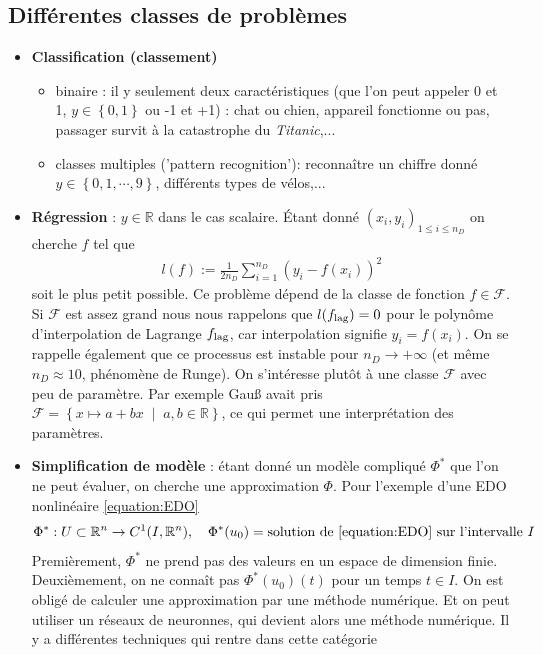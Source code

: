 \documentclass[11pt,a4paper, french]{article}
\newcommand{\ndata}{n_D}
\newcommand{\R}{\mathbb R}
\newcommand{\Set}[1]{\left\{#1\right\}}
\newcommand{\SetDef}[2]{\left\{#1\;\middle|\;#2\right\}}
\begin{document}
\subsection{Différentes classes de problèmes}\label{subsec:}
%
\begin{itemize}
%
\item \textbf{Classification (classement)}
\begin{itemize}
\item binaire : il y seulement deux caractéristiques (que l'on peut appeler 0 et 1, $y\in\Set{0,1}$ ou -1 et +1) : chat ou chien, appareil fonctionne ou pas, passager survit à la catastrophe du \textit{Titanic},...
\item classes multiples ('pattern recognition'): reconnaître un chiffre donné $y\in\Set{0,1,\cdots,9}$, différents types de vélos,...
\end{itemize}
%
\item \textbf{Régression} : $y\in\R$ dans le cas scalaire. Étant donné $(x_i,y_i)_{1\le i\le \ndata}$ on cherche $f$ tel que
\begin{align*}
l(f) := \frac{1}{2\ndata}\sum_{i=1}^{\ndata}\left(y_i - f(x_i)\right)^2
\end{align*}
%
soit le plus petit possible. Ce problème dépend de la classe de fonction $f\in\mathcal F$. Si $\mathcal F$ est assez grand nous nous rappelons 
que $l(f_{\rm lag})=0$ pour le polynôme d'interpolation de Lagrange $f_{\rm lag}$, car interpolation signifie $y_i=f(x_i)$.
On se rappelle également que ce processus est instable pour $\ndata\to+\infty$ (et même $\ndata\approx 10$, phénomène de Runge).
%
On s'intéresse plutôt à une classe $\mathcal F$ avec peu de paramètre. Par exemple Gau{\ss} avait pris 
$\mathcal F=\SetDef{x\mapsto a + bx}{a,b\in\R}$, ce qui permet une interprétation des paramètres.
%
\item \textbf{Simplification de modèle} : étant donné un modèle compliqué $\Phi^*$ que l'on ne peut évaluer, on cherche une approximation $\Phi$. Pour l'exemple d'une EDO nonlinéaire \eqref{equation:EDO} 
\begin{align*}
\Phi^* : U\subset\R^n \to C^1(I, \R^n),\quad \Phi^*(u_0) = \mbox{solution de \eqref{equation:EDO} sur l'intervalle $I$}
\end{align*}
Premièrement, $\Phi^*$ ne prend pas des valeurs en un espace de dimension finie. Deuxièmement, on ne connaît pas $\Phi^*(u_0)(t)$ pour un temps $t\in I$. On est obligé de calculer une approximation par une méthode numérique. Et on peut utiliser un réseaux de neuronnes, qui devient alors une méthode numérique. Il y a différentes techniques qui rentre dans cette catégorie

\end{itemize}
\end{document}
